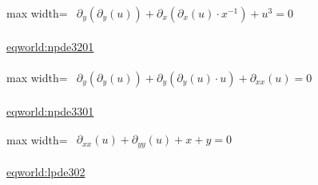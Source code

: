 \documentclass[10pt,a4paper]{article}
\begin{document}
\begin{minipage}{\linewidth}
\begin{center}\begin{adjustbox}{max width=\linewidth}$\displaystyle\begin{gathered}\begin{gathered}\partial_{y}(\partial_{y}(u))+\partial_{x}(\partial_{x}(u)\cdot x^{-1})+u^{3}=0\end{gathered}\end{gathered}$\end{adjustbox}\end{center}
{\small \href{https://eqworld.ipmnet.ru/en/solutions/npde/npde3201.pdf}{eqworld:npde3201}}\par
\end{minipage}\par\vspace{7mm}

\begin{minipage}{\linewidth}
\begin{center}\begin{adjustbox}{max width=\linewidth}$\displaystyle\begin{gathered}\begin{gathered}\partial_{y}(\partial_{y}(u))+\partial_{y}(\partial_{y}(u)\cdot u)+\partial_{xx}(u)=0\end{gathered}\end{gathered}$\end{adjustbox}\end{center}
{\small \href{https://eqworld.ipmnet.ru/en/solutions/npde/npde3301.pdf}{eqworld:npde3301}}\par
\end{minipage}\par\vspace{7mm}

\begin{minipage}{\linewidth}
\begin{center}\begin{adjustbox}{max width=\linewidth}$\displaystyle\begin{gathered}\begin{gathered}\partial_{xx}(u)+\partial_{yy}(u)+x+y=0\end{gathered}\end{gathered}$\end{adjustbox}\end{center}
{\small \href{https://eqworld.ipmnet.ru/en/solutions/lpde/lpde302.pdf}{eqworld:lpde302}}\par
\end{minipage}\par\vspace{7mm}
\end{document}
